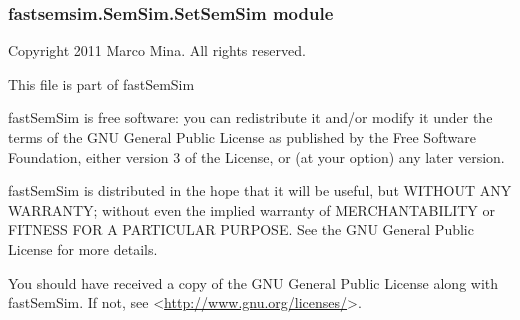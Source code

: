 \documentclass[letterpaper,10pt,english]{sphinxmanual}
\begin{document}
\begin{fulllineitems}

\begin{fulllineitems}
\label{fastsemsim.SemSim:fastsemsim.SemSim.SemSimUtils.SemSimUtils.int_det_p_table}
\end{fulllineitems}


\begin{fulllineitems}
\label{fastsemsim.SemSim:fastsemsim.SemSim.SemSimUtils.SemSimUtils.int_merge_sets}
\end{fulllineitems}


\begin{fulllineitems}
\label{fastsemsim.SemSim:fastsemsim.SemSim.SemSimUtils.SemSimUtils.intersection}
\end{fulllineitems}


\end{fulllineitems}



\subsubsection{fastsemsim.SemSim.SetSemSim module}
\label{fastsemsim.SemSim:fastsemsim-semsim-setsemsim-module}\label{fastsemsim.SemSim:module-fastsemsim.SemSim.SetSemSim}
Copyright 2011 Marco Mina. All rights reserved.

This file is part of fastSemSim

fastSemSim is free software: you can redistribute it and/or modify
it under the terms of the GNU General Public License as published by
the Free Software Foundation, either version 3 of the License, or
(at your option) any later version.

fastSemSim is distributed in the hope that it will be useful,
but WITHOUT ANY WARRANTY; without even the implied warranty of
MERCHANTABILITY or FITNESS FOR A PARTICULAR PURPOSE.  See the
GNU General Public License for more details.

You should have received a copy of the GNU General Public License
along with fastSemSim.  If not, see \textless{}\href{http://www.gnu.org/licenses/}{http://www.gnu.org/licenses/}\textgreater{}.
\end{document}
